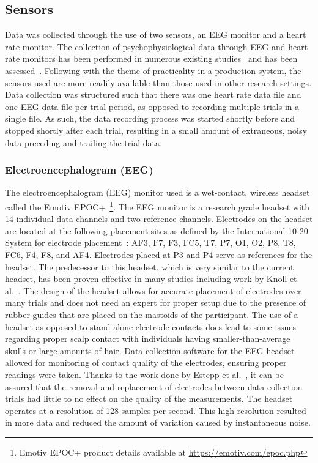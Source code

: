 \documentclass[11pt]{article}
\begin{document}
	\subsection{Sensors}
	Data was collected through the use of two sensors, an EEG monitor and a heart rate monitor. The collection of psychophysiological data through EEG and heart rate monitors has been performed in numerous existing studies~\cite{Wilson, Yang, Wang_Z} and has been assessed~\cite{Sweller}. Following with the theme of practicality in a production system, the sensors used are more readily available than those used in other research settings. Data collection was structured such that there was one heart rate data file and one EEG data file per trial period, as opposed to recording multiple trials in a single file. As such, the data recording process was started shortly before and stopped shortly after each trial, resulting in a small amount of extraneous, noisy data preceding and trailing the trial data.
		
		\subsubsection{Electroencephalogram (EEG)}
		The electroencephalogram (EEG) monitor used is a wet-contact, wireless headset called the Emotiv EPOC+~\footnote{Emotiv EPOC+ product details available at \url{https://emotiv.com/epoc.php}}. The EEG monitor is a research grade headset with 14 individual data channels and two reference channels. Electrodes on the headset are located at the following placement sites as defined by the International 10-20 System for electrode placement~\cite{Jasper}: AF3, F7, F3, FC5, T7, P7, O1, O2, P8, T8, FC6, F4, F8, and AF4. Electrodes placed at P3 and P4 serve as references for the headset. The predecessor to this headset, which is very similar to the current headset, has been proven effective in many studies including work by Knoll et al.~\cite{Knoll}. The design of the headset allows for accurate placement of electrodes over many trials and does not need an expert for proper setup due to the presence of rubber guides that are placed on the mastoids of the participant. The use of a headset as opposed to stand-alone electrode contacts does lead to some issues regarding proper scalp contact with individuals having smaller-than-average skulls or large amounts of hair. Data collection software for the EEG headset allowed for monitoring of contact quality of the electrodes, ensuring proper readings were taken. Thanks to the work done by Estepp et al.~\cite{Estepp_2015}, it can be assured that the removal and replacement of electrodes between data collection trials had little to no effect on the quality of the measurements. The headset operates at a resolution of 128 samples per second. This high resolution resulted in more data and reduced the amount of variation caused by instantaneous noise.
			
\end{document}
